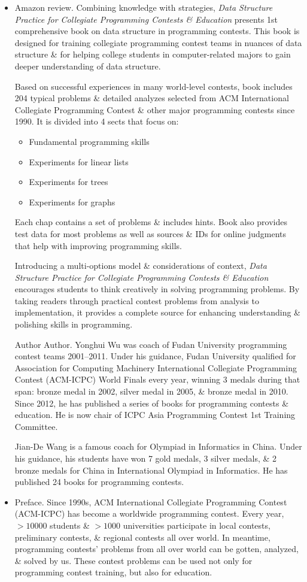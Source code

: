 \documentclass{article}
\begin{document}
\begin{itemize}
	\item {\sf Amazon review.} Combining knowledge with strategies, {\it Data Structure Practice for Collegiate Programming Contests \& Education} presents 1st comprehensive book on data structure in programming contests. This book is designed for training collegiate programming contest teams in nuances of data structure \& for helping college students in computer-related majors to gain deeper understanding of data structure.
	
	Based on successful experiences in many world-level contests, book includes 204 typical problems \& detailed analyzes selected from ACM International Collegiate Programming Contest \& other major programming contests since 1990. It is divided into 4 sects that focus on:
	\begin{itemize}
		\item Fundamental programming skills
		\item Experiments for linear lists
		\item Experiments for trees
		\item Experiments for graphs
	\end{itemize}
	Each chap contains a set of problems \& includes hints. Book also provides test data for most problems as well as sources \& IDs for online judgments that help with improving programming skills.
	
	Introducing a multi-options model \& considerations of context, {\it Data Structure Practice for Collegiate Programming Contests \& Education} encourages students to think creatively in solving programming problems. By taking readers through practical contest problems from analysis to implementation, it provides a complete source for enhancing understanding \& polishing skills in programming.
	
	{\sf Author Author.} {\sc Yonghui Wu} was coach of Fudan University programming contest teams 2001--2011. Under his guidance, Fudan University qualified for Association for Computing Machinery International Collegiate Programming Contest (ACM-ICPC) World Finals every year, winning 3 medals during that span: bronze medal in 2002, silver medal in 2005, \& bronze medal in 2010. Since 2012, he has published a series of books for programming contests \& education. He is now chair of ICPC Asia Programming Contest 1st Training Committee.
	
	{\sc Jian-De Wang} is a famous coach for Olympiad in Informatics in China. Under his guidance, his students have won 7 gold medals, 3 silver medals, \& 2 bronze medals for China in International Olympiad in Informatics. He has published 24 books for programming contests.
	\item {\sf Preface.} Since 1990s, ACM International Collegiate Programming Contest (ACM-ICPC) has become a worldwide programming contest. Every year, $> 10000$ students \& $> 1000$ universities participate in local contests, preliminary contests, \& regional contests all over world. In meantime, programming contests' problems from all over world can be gotten, analyzed, \& solved by us. These contest problems can be used not only for programming contest training, but also for education.
	

\end{itemize}
\end{document}
